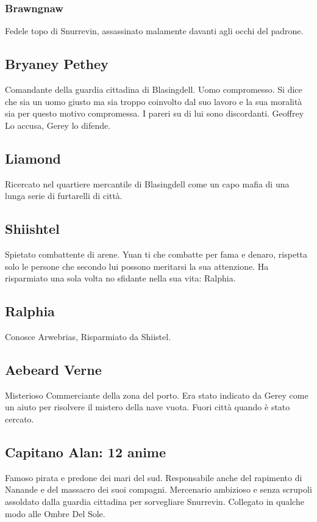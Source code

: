 \subsubsection{Brawngnaw}\label{char:brawngnaw}
Fedele topo di Snurrevin, assassinato malamente davanti agli occhi del padrone.
\subsection{Bryaney Pethey}\label{char:bryaney}
Comandante della guardia cittadina di Blasingdell. Uomo compromesso. Si dice che
sia un uomo giusto ma sia troppo coinvolto dal suo lavoro e la sua moralit\`a
sia per questo motivo compromessa. I pareri su di lui sono discordanti. Geoffrey
Lo accusa, Gerey lo difende.
\subsection{Liamond}\label{char:liamond}
Ricercato nel quartiere mercantile di Blasingdell come un capo mafia di una
lunga serie di furtarelli di citt\`a.
\subsection{Shiishtel}\label{char:shiishtel}
Spietato combattente di arene. Yuan ti che combatte per fama e denaro, rispetta
solo le persone che secondo lui possono meritarsi la sua attenzione. Ha risparmiato una
sola volta no sfidante nella sua vita: Ralphia.
\subsection{Ralphia}\label{char:ralphia}
Conosce Arwebrias, Risparmiato da Shiistel.
\subsection{Aebeard Verne}\label{char:aebeard}
Misterioso Commerciante della zona del porto. Era stato indicato da Gerey come un
aiuto per risolvere il mistero della nave vuota. Fuori citt\`a quando \`e stato cercato.
\subsection{Capitano Alan: 12 anime}\label{char:alan}
Famoso pirata e predone dei mari del sud. Responsabile anche del rapimento di Nanande e
del massacro dei suoi compagni. Mercenario ambizioso e senza scrupoli assoldato
dalla guardia cittadina per sorvegliare Snurrevin. Collegato in qualche modo alle
Ombre Del Sole.
